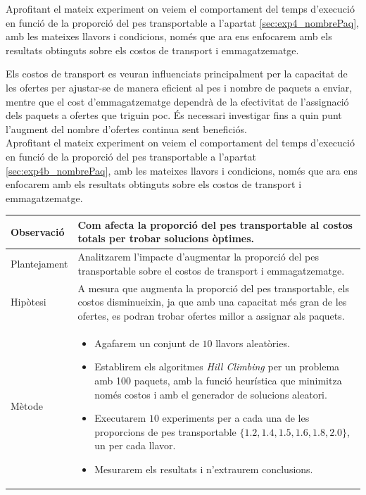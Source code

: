 \documentclass[a4paper]{article}
\begin{document}
	Aprofitant el mateix experiment on veiem el comportament del temps d'execució en funció de la proporció del pes transportable a l'apartat \ref{sec:exp4_nombrePaq}, amb les mateixes llavors i condicions, només que ara ens enfocarem amb els resultats obtinguts sobre els costos de transport i emmagatzematge.\\
		\begin{table}[ht]
	Els costos de transport es veuran influenciats principalment per la capacitat de les ofertes per ajustar-se de manera eficient al pes i nombre de paquets a enviar, mentre que el cost d'emmagatzematge dependrà de la efectivitat de l'assignació dels paquets a ofertes que triguin poc. És necessari investigar fins a quin punt l'augment del nombre d'ofertes continua sent beneficiós. \\
	
	Aprofitant el mateix experiment on veiem el comportament del temps d'execució en funció de la proporció del pes transportable a l'apartat \ref{sec:exp4b_nombrePaq}, amb les mateixes llavors i condicions, només que ara ens enfocarem amb els resultats obtinguts sobre els costos de transport i emmagatzematge.
	
	\begin{table}[H]
		\centering
		\begin{tabular}{|l|p{10cm}|}
			\hline
			Observació & Com afecta la proporció del pes transportable al costos totals per trobar solucions òptimes.\\
			\hline
			Plantejament & Analitzarem l'impacte d'augmentar la proporció del pes transportable sobre el costos de transport i emmagatzematge. \\
			\hline
			Hipòtesi & A mesura que augmenta la proporció del pes transportable, els costos disminueixin, ja que amb una capacitat més gran de les ofertes, es podran trobar ofertes millor a assignar als paquets.\\
			\hline
			Mètode &
			\begin{itemize}
				\item Agafarem un conjunt de $10$ llavors aleatòries.
				\item Establirem els algoritmes \textit{Hill Climbing} per un problema amb 100 paquets, amb la funció heurística que minimitza només costos i amb el generador de solucions aleatori.
				\item Executarem $10$ experiments per a cada una de les proporcions de pes transportable $\{1.2, 1.4, 1.5, 1.6, 1.8, 2.0 \}$, un per cada llavor.
				\item Mesurarem els resultats i n'extraurem conclusions.
			\end{itemize} \\
			\hline
		\end{tabular}
		\label{tab:exp5_apartats}
	\end{table}
	

\end{table}
\end{document}
